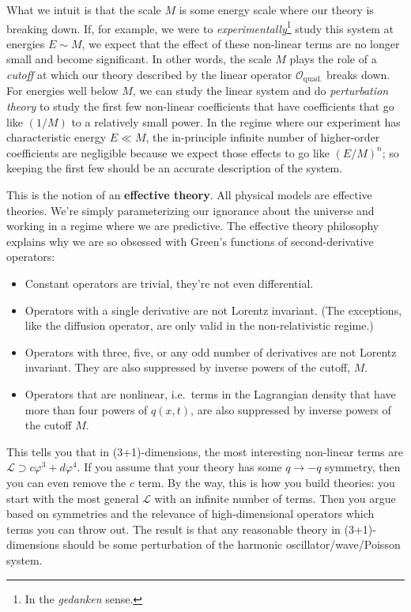What we intuit is that the scale $M$ is some energy scale where our theory is breaking down. If, for example, we were to \emph{experimentally}\footnote{In the \emph{gedanken} sense.} study this system at energies $E\sim M$, we expect that the effect of these non-linear terms are no longer small and become significant. In other words, the scale $M$ plays the role of a \emph{cutoff} at which our theory described by the linear operator $\mathcal O_\text{quad.}$ breaks down. For energies well below $M$, we can study the linear system and do \emph{perturbation theory} to study the first few non-linear coefficients that have coefficients that go like $(1/M)$ to a relatively small power. In the regime where our experiment has characteristic energy $E\ll M$, the in-principle infinite number of higher-order coefficients are negligible because we expect those effects to go like $(E/M)^n$; so keeping the first few should be an accurate description of the system.

This is the notion of an \textbf{effective theory}. All physical models are effective theories. We're simply parameterizing our ignorance about the universe and working in a regime where we are predictive. The effective theory philosophy explains why we are so obsessed with Green's functions of second-derivative operators:
\begin{itemize}
	\item Constant operators are trivial, they're not even differential.
	\item Operators with a single derivative are not Lorentz invariant. (The exceptions, like the diffusion operator, are only valid in the non-relativistic regime.)
	\item Operators with three, five, or any odd number of derivatives are not Lorentz invariant. They are also suppressed by inverse powers of the cutoff, $M$.
	\item Operators that are nonlinear, i.e.~terms in the Lagrangian density that have more than four powers of $q(x,t)$, are also suppressed by inverse powers of the cutoff $M$.
\end{itemize}
This tells you that in (3+1)-dimensions, the most interesting non-linear terms are $\mathcal L \supset c\varphi^3+ d\varphi^4$. If you assume that your theory has some $q\to -q$ symmetry, then you can even remove the $c$ term. By the way, this is how you build theories: you start with the most general $\mathcal L$ with an infinite number of terms. Then you argue based on symmetries and the relevance of high-dimensional operators which terms you can throw out. The result is that any reasonable theory in (3+1)-dimensions should be some perturbation of the harmonic oscillator/wave/Poisson system.

